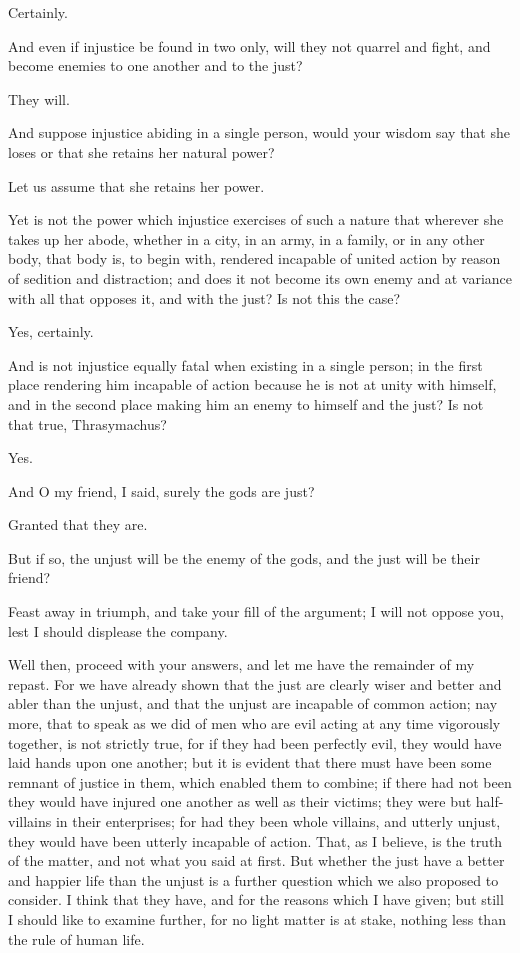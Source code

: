 Certainly.

And even if injustice be found in two only, will they not quarrel and
fight, and become enemies to one another and to the just?

They will.

And suppose injustice abiding in a single person, would your wisdom say
that she loses or that she retains her natural power?

Let us assume that she retains her power.

Yet is not the power which injustice exercises of such a nature that
wherever she takes up her abode, whether in a city, in an army, in a
family, or in any other body, that body is, to begin with, rendered
incapable of united action by reason of sedition and distraction; and
does it not become its own enemy and at variance with all that opposes
it, and with the just? Is not this the case?

Yes, certainly.

And is not injustice equally fatal when existing in a single person; in
the first place rendering him incapable of action because he is not
at unity with himself, and in the second place making him an enemy to
himself and the just? Is not that true, Thrasymachus?

Yes.

And O my friend, I said, surely the gods are just?

Granted that they are.

But if so, the unjust will be the enemy of the gods, and the just will
be their friend?

Feast away in triumph, and take your fill of the argument; I will not
oppose you, lest I should displease the company.

Well then, proceed with your answers, and let me have the remainder of
my repast. For we have already shown that the just are clearly wiser and
better and abler than the unjust, and that the unjust are incapable of
common action; nay more, that to speak as we did of men who are evil
acting at any time vigorously together, is not strictly true, for
if they had been perfectly evil, they would have laid hands upon one
another; but it is evident that there must have been some remnant of
justice in them, which enabled them to combine; if there had not been
they would have injured one another as well as their victims; they
were but half-villains in their enterprises; for had they been whole
villains, and utterly unjust, they would have been utterly incapable of
action. That, as I believe, is the truth of the matter, and not what you
said at first. But whether the just have a better and happier life than
the unjust is a further question which we also proposed to consider. I
think that they have, and for the reasons which I have given; but still
I should like to examine further, for no light matter is at stake,
nothing less than the rule of human life.

